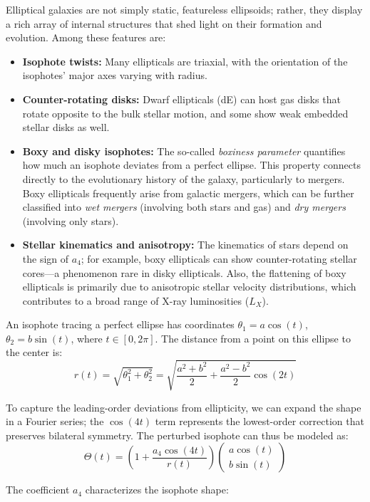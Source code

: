 Elliptical galaxies are not simply static, featureless ellipsoids; rather, they display a rich array of internal structures that shed light on their formation and evolution. Among these features are:

\begin{itemize}
    \item \textbf{Isophote twists:} Many ellipticals are triaxial, with the orientation of the isophotes' major axes varying with radius.
    \item \textbf{Counter-rotating disks:} Dwarf ellipticals (dE) can host gas disks that rotate opposite to the bulk stellar motion, and some show weak embedded stellar disks as well.
    \item \textbf{Boxy and disky isophotes:} The so-called \textit{boxiness parameter} quantifies how much an isophote deviates from a perfect ellipse. This property connects directly to the evolutionary history of the galaxy, particularly to mergers. Boxy ellipticals frequently arise from galactic mergers, which can be further classified into \textit{wet mergers} (involving both stars and gas) and \textit{dry mergers} (involving only stars).
    \item \textbf{Stellar kinematics and anisotropy:} The kinematics of stars depend on the sign of $a_4$; for example, boxy ellipticals can show counter-rotating stellar cores—a phenomenon rare in disky ellipticals. Also, the flattening of boxy ellipticals is primarily due to anisotropic stellar velocity distributions, which contributes to a broad range of X-ray luminosities ($L_X$).
\end{itemize}

An isophote tracing a perfect ellipse has coordinates $\theta_1 = a \cos(t)$, $\theta_2 = b \sin(t)$, where $t \in [0, 2\pi]$. The distance from a point on this ellipse to the center is:
$$
r(t) = \sqrt{\theta_1^2 + \theta_2^2} = \sqrt{\frac{a^2+b^2}{2} + \frac{a^2-b^2}{2}\cos(2t)}
$$

To capture the leading-order deviations from ellipticity, we can expand the shape in a Fourier series; the $\cos(4t)$ term represents the lowest-order correction that preserves bilateral symmetry. The perturbed isophote can thus be modeled as:
$$
\Theta(t) = \left( 1 + \frac{a_4 \cos(4t)}{r(t)} \right) \begin{pmatrix} a \cos(t) \\ b \sin(t) \end{pmatrix}
$$

The coefficient $a_4$ characterizes the isophote shape:

